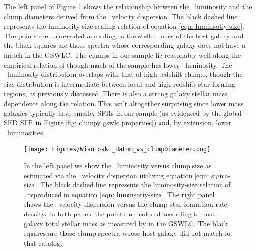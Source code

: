 The left panel of Figure \ref{fig: clump scatter plots} shows the relationship between the \ha~luminosity and the clump diameters derived from the \ha~velocity dispersion. The black dashed line represents the luminosity-size scaling relation of equation \ref{eqn: luminsotiy-size}. The points are color-coded according to the stellar mass of the host galaxy and the black squares are those spectra whose corresponding galaxy does not have a match in the GSWLC. The clumps in our sample lie reasonably well along the empirical relation of \cite{Wisnioski2012} though much of the sample has lower \ha~luminosity. The \ha~luminosity distribution overlaps with that of high redshift clumps, though the size distribution is intermediate between local and high-redshift star-forming regions, as previously discussed. There is also a strong galaxy stellar mass dependence along the relation. This isn't altogether surprising since lower mass galaxies typically have smaller SFRs in our sample (as evidenced by the global SED SFR in Figure \ref{fig: clumpy gswlc properties}) and, by extension, lower \ha~luminosities. 

\begin{figure}
\centering
\texttt{[image: Figures/Wisnioski\_HaLum\_vs\_clumpDiameter.png]}
\caption[Clump properties: $L(\mathrm{H}_{\alpha})$ vs size and $\sigma_{H_{\alpha}}$ vs $\Sigma_{SFR}$]{In the left panel we show the \ha~luminosity versus clump size as estimated via the \ha~velocity dispersion utilizing equation \ref{eqn: sigma-size}. The black dashed line represents the luminosity-size relation of \cite{Wisnioski2012}, reproduced in equation \ref{eqn: luminsotiy-size}. The right panel shows the \ha~velocity dispersion versus the clump star formation rate density. In both panels the points are colored according to host galaxy total stellar mass as measured by \cite{Salim2016} in the GSWLC. The black squares are those clump spectra whose host galaxy did not match to that catalog.}
\label{fig: clump scatter plots}
\end{figure}

